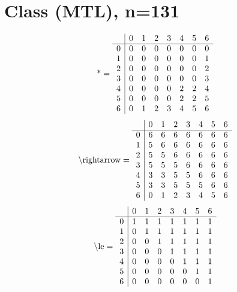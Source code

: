 \documentclass[11pt]{article}
\begin{document}
\section{Class (MTL), n=131}
\[\text{*} = 
\begin{array}{r | r r r r r r r}
 & 0 & 1 & 2 & 3 & 4 & 5 & 6 \\ \hline
0 & 0 & 0 & 0 & 0 & 0 & 0 & 0 \\
1 & 0 & 0 & 0 & 0 & 0 & 0 & 1 \\
2 & 0 & 0 & 0 & 0 & 0 & 0 & 2 \\
3 & 0 & 0 & 0 & 0 & 0 & 0 & 3 \\
4 & 0 & 0 & 0 & 0 & 2 & 2 & 4 \\
5 & 0 & 0 & 0 & 0 & 2 & 2 & 5 \\
6 & 0 & 1 & 2 & 3 & 4 & 5 & 6 \\
\end{array}
\]
\[\text{\textbackslash rightarrow} = 
\begin{array}{r | r r r r r r r}
 & 0 & 1 & 2 & 3 & 4 & 5 & 6 \\ \hline
0 & 6 & 6 & 6 & 6 & 6 & 6 & 6 \\
1 & 5 & 6 & 6 & 6 & 6 & 6 & 6 \\
2 & 5 & 5 & 6 & 6 & 6 & 6 & 6 \\
3 & 5 & 5 & 5 & 6 & 6 & 6 & 6 \\
4 & 3 & 3 & 5 & 5 & 6 & 6 & 6 \\
5 & 3 & 3 & 5 & 5 & 5 & 6 & 6 \\
6 & 0 & 1 & 2 & 3 & 4 & 5 & 6 \\
\end{array}
\]
\[\text{\textbackslash le} = 
\begin{array}{r | r r r r r r r}
 & 0 & 1 & 2 & 3 & 4 & 5 & 6 \\ \hline
0 & 1 & 1 & 1 & 1 & 1 & 1 & 1 \\
1 & 0 & 1 & 1 & 1 & 1 & 1 & 1 \\
2 & 0 & 0 & 1 & 1 & 1 & 1 & 1 \\
3 & 0 & 0 & 0 & 1 & 1 & 1 & 1 \\
4 & 0 & 0 & 0 & 0 & 1 & 1 & 1 \\
5 & 0 & 0 & 0 & 0 & 0 & 1 & 1 \\
6 & 0 & 0 & 0 & 0 & 0 & 0 & 1 \\
\end{array}
\]
\end{document}
